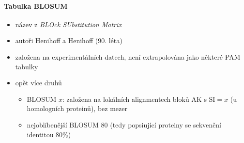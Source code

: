 \documentclass[DIV=8]{scrreprt}
\begin{document}
\paragraph{Tabulka BLOSUM}
\begin{itemize}[nosep]
    \item název z \emph{BLOck SUbstitution Matrix}
    \item autoři Henihoff a Henihoff (90. léta)
    \item založena na experimentálních datech, není extrapolována jako některé PAM tabulky
    \item opět více druhů
\begin{itemize}[nosep]
    \item BLOSUM \(x\): založena na lokálních alignmentech bloků AK s \(\text{SI}=x\) (u homologních proteinů), bez mezer
    \item nejoblíbenější BLOSUM 80 (tedy popsiující proteiny se sekvenční identitou 80\%)
\end{itemize}

\end{itemize}
\end{document}
